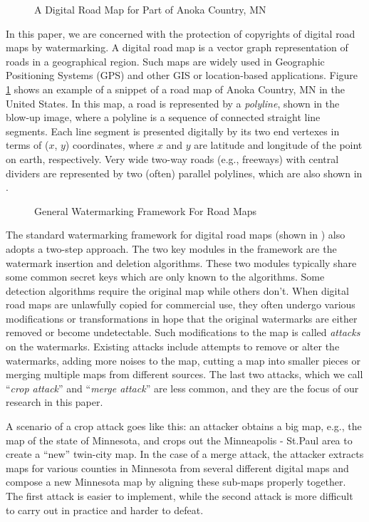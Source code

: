 \begin{figure}[th]
\centering
{}
\caption{A Digital Road Map for Part of Anoka Country, MN}
\label{fig:anoka}
\end{figure}

In this paper, we are concerned with the protection of copyrights of
digital road maps by watermarking. A digital road map is a vector graph
representation of roads in a geographical region. Such maps are 
widely used in Geographic Positioning Systems (GPS) and other GIS or
location-based applications.
Figure \ref{fig:anoka} shows an example of a snippet of a
road map of Anoka Country, MN in the United States. 
In this map, a road is represented by a {\em polyline}, 
shown in the blow-up image, where a polyline is a sequence of connected
straight line segments. Each line segment is presented digitally by its
two end vertexes in terms of ($x$, $y$) coordinates, where $x$ and $y$ are
latitude and longitude of the point on earth, respectively. Very wide two-way
roads (e.g., freeways) with central dividers are represented by two (often)
parallel polylines, which are also shown in .

\begin{figure}[th]
\centering
{}
\caption{General Watermarking Framework For Road Maps}
\label{fig:workflow}
\end{figure}

The standard watermarking framework for digital road maps 
(shown in ) also adopts a two-step approach.
The two key modules in the framework are the watermark insertion
and deletion algorithms. These two modules typically share some
common secret keys which are only known to the algorithms. Some
detection algorithms require the original map while others don't.
When digital road maps are unlawfully copied for commercial use,
they often undergo various modifications or transformations in hope that
the original watermarks are either removed or become undetectable.
Such modifications to the map is called {\em attacks} on the watermarks.
Existing attacks include attempts to remove or alter the watermarks, 
adding more noises to the map, cutting a map into smaller pieces or 
merging multiple maps from different sources. The last two attacks, which
we call ``{\em crop attack}'' and ``{\em merge attack}'' are less common, 
and they are the focus of our research in this paper.  

A scenario of a crop attack goes like this: an attacker obtains a big map, 
e.g., the map of the state of Minnesota, 
and crops out the Minneapolis - St.Paul area 
to create a ``new'' twin-city map. In the case of a merge attack, the attacker
extracts maps for various counties in Minnesota from several different
digital maps and compose a new Minnesota map by aligning these sub-maps
properly together. The first attack is easier to implement, while the second
attack is more difficult to carry out in practice and harder to defeat.
 
